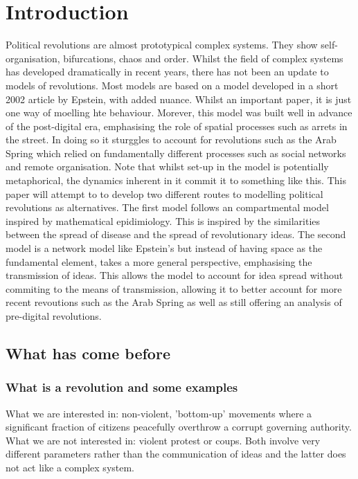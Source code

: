 \chapter{Introduction}
Political revolutions are almost prototypical complex systems. They show self-organisation, bifurcations, chaos and order. Whilst the field of complex systems has developed dramatically in recent years, there has not been an update to models of revolutions. Most models\cite{1}\cite{2}\cite{3} are based on a model developed in a short 2002 article by Epstein\cite{epstein}, with added nuance. Whilst an important paper, it is just one way of moelling hte behaviour. Morever, this model was built well in advance of the post-digital era, emphasising the role of spatial processes such as arrets in the street. In doing so it sturggles to account for revolutions such as the Arab Spring which relied on fundamentally different processes such as social networks and remote organisation. Note that whilst set-up in the model is potentially metaphorical, the dynamics inherent in it commit it to something like this. This paper will attempt to to develop two different routes to modelling political revolutions as alternatives. The first model follows an compartmental model inspired by mathematical epidimiology. This is inspired by the similarities between the spread of disease and the spread of revolutionary ideas. The second model is a network model like Epstein's but instead of having space as the fundamental element, takes a more general perspective, emphasising the transmission of ideas. This allows the model to account for idea spread without commiting to the means of transmission, allowing it to better account for more recent revoutions such as the Arab Spring as well as still offering an analysis of pre-digital revolutions.

\section{What has come before}
\subsection{What is a revolution and some examples}
What we are interested in: non-violent, 'bottom-up' movements where a significant fraction of citizens peacefully overthrow a corrupt governing authority.\\
What we are not interested in: violent protest or coups. Both involve very different parameters rather than the communication of ideas and the latter does not act like a complex system.

